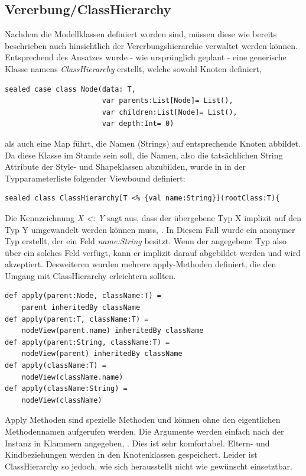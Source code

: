 \subsection{Vererbung/ClassHierarchy}
Nachdem die Modellklassen definiert worden sind, müssen diese wie bereits beschrieben auch hinsichtlich der Vererbungshierarchie verwaltet werden können. Entsprechend des Ansatzes wurde - wie ursprünglich geplant - eine generische Klasse namens \textit{ClassHierarchy} erstellt, welche sowohl Knoten definiert,
\begin{lstlisting}[style=scala]
sealed case class Node(data: T,
                       var parents:List[Node]= List(),
                       var children:List[Node]= List(),
                       var depth:Int= 0)
\end{lstlisting}
als auch eine Map führt, die Namen (Strings) auf entsprechende Knoten abbildet.
Da diese Klasse im Stande sein soll, die Namen, also die tatsächlichen String  Attribute der Style- und Shapeklassen abzubilden, wurde in in der Typparameterliste folgender Viewbound definiert:
\begin{lstlisting}[style=scala]
sealed class ClassHierarchy[T <% {val name:String}](rootClass:T){
\end{lstlisting}Die Kennzeichnung \textit{ X \textless: Y} sagt aus, dass der übergebene Typ X implizit auf den Typ Y umgewandelt werden können muss, \citet[p. 158]{braun:scala}.
In Diesem Fall wurde ein anonymer Typ erstellt, der ein Feld \textit{name:String} besitzt. Wenn der angegebene Typ also über ein solches Feld verfügt, kann er implizit darauf abgebildet werden und wird akzeptiert.
Desweiteren wurden mehrere apply-Methoden definiert, die den Umgang mit ClassHierarchy erleichtern sollten.
\begin{lstlisting}[style=scala]
def apply(parent:Node, className:T) =
	parent inheritedBy className
def apply(parent:T, className:T) =
	nodeView(parent.name) inheritedBy className
def apply(parent:String, className:T) =
	nodeView(parent) inheritedBy className
def apply(className:T) =
	nodeView(className.name)
def apply(className:String) = 
	nodeView(className)
\end{lstlisting} Apply Methoden sind spezielle Methoden und können ohne den eigentlichen Methodennamen aufgerufen werden. Die Argumente werden einfach nach der Instanz in Klammern angegeben, \citet[p. 74]{esser:scala}. Dies ist sehr komfortabel. Eltern- und Kindbeziehungen werden in den Knotenklassen gespeichert. Leider ist ClassHierarchy so jedoch, wie sich herausstellt nicht wie gewünscht einsetztbar.

